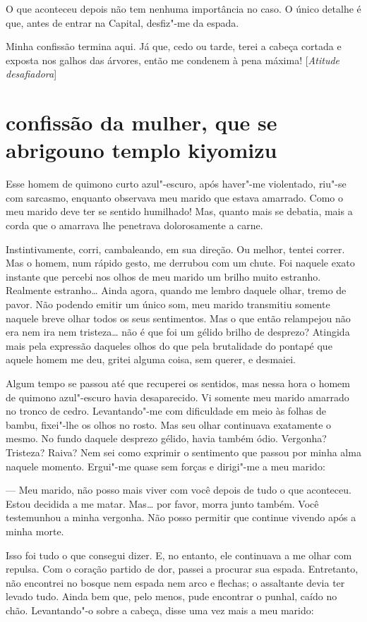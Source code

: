 O que aconteceu depois não tem nenhuma importância no caso. O único
detalhe é que, antes de entrar na Capital, desfiz"-me da espada.

Minha confissão termina aqui. Já que, cedo ou tarde, terei a cabeça
cortada e exposta nos galhos das árvores, então me condenem à pena
máxima! [\textit{Atitude desafiadora}]

\section*{confissão da mulher, que se abrigou\break no templo kiyomizu}

Esse homem de quimono curto azul"-escuro, após haver"-me violentado,
riu"-se com sarcasmo, enquanto observava meu marido que estava amarrado.
Como o meu marido deve ter se sentido humilhado! Mas, quanto mais se
debatia, mais a corda que o amarrava lhe penetrava dolorosamente a
carne.

Instintivamente, corri, cambaleando, em sua direção. Ou melhor, tentei
correr. Mas o homem, num rápido gesto, me derrubou com um chute. Foi
naquele exato instante que percebi nos olhos de meu marido um brilho
muito estranho. Realmente estranho\ldots{} Ainda agora, quando me lembro
daquele olhar, tremo de pavor. Não podendo emitir um único som, meu
marido transmitiu somente naquele breve olhar todos os seus
sentimentos. Mas o que então relampejou não era nem ira nem tristeza\ldots{} 
não é que foi um gélido brilho de desprezo? Atingida mais pela
expressão daqueles olhos do que pela brutalidade do pontapé que aquele
homem me deu, gritei alguma coisa, sem querer, e desmaiei.

Algum tempo se passou até que recuperei os sentidos, mas nessa hora o
homem de quimono azul"-escuro havia desaparecido. Vi somente meu marido
amarrado no tronco de cedro. Levantando"-me com dificuldade em meio às
folhas de bambu, fixei"-lhe os olhos no rosto. Mas seu olhar continuava
exatamente o mesmo. No fundo daquele desprezo gélido, havia também
ódio. Vergonha? Tristeza? Raiva? Nem sei como exprimir o sentimento que
passou por minha alma naquele momento. Ergui"-me quase sem forças e
dirigi"-me a meu marido:

--- Meu marido, não posso mais viver com você depois de tudo o que
aconteceu. Estou decidida a me matar. Mas\ldots{} por favor, morra junto
também. Você testemunhou a minha vergonha. Não posso permitir que
continue vivendo após a minha morte.					

Isso foi tudo o que consegui dizer. E, no entanto, ele continuava a me
olhar com repulsa. Com o coração partido de dor, passei a procurar sua
espada. Entretanto, não encontrei no bosque nem espada nem arco e
flechas; o assaltante devia ter levado tudo. Ainda bem que, pelo menos,
pude encontrar o punhal, caído no chão. Levantando"-o sobre a cabeça,
disse uma vez mais a meu marido:

